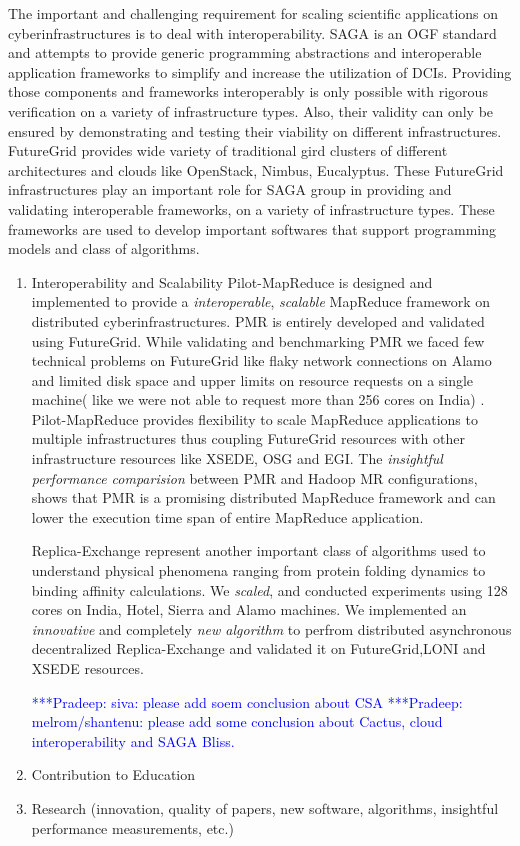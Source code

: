 \documentclass[]{paper}
\newcommand{\pmnote}[1]{ {\textcolor{blue} { ***Pradeep: #1 }}}
\newcommand{\pmnote}[1]{}
\begin{document}
The important and challenging requirement for scaling scientific applications on cyberinfrastructures is to deal with interoperability.  SAGA is an OGF standard and attempts to provide generic programming abstractions and interoperable application frameworks to simplify and increase the utilization of DCIs. Providing those components and frameworks interoperably is only possible with rigorous verification on a variety of infrastructure types. Also, their validity can only be ensured by demonstrating and testing their viability on different infrastructures. FutureGrid provides wide variety of traditional gird clusters of different architectures and clouds like OpenStack, Nimbus, Eucalyptus.  These FutureGrid infrastructures play an important role for SAGA group in providing and validating interoperable frameworks, on a variety of infrastructure types.  These frameworks are used to develop important softwares that support programming models and class of algorithms. 

\begin{enumerate}
\item Interoperability and Scalability
Pilot-MapReduce is designed  and implemented to provide a \textit{interoperable},  \textit{scalable} MapReduce framework on distributed cyberinfrastructures. PMR is entirely developed and validated using FutureGrid.  While validating and benchmarking PMR we faced few technical problems on FutureGrid like flaky network connections on Alamo and limited disk space and upper limits on resource requests on a single machine( like we were not able to request more than 256 cores on India) . Pilot-MapReduce provides flexibility to scale MapReduce applications to multiple infrastructures thus coupling FutureGrid resources with other infrastructure resources like XSEDE, OSG and EGI.  The \textit{insightful performance comparision} between PMR and Hadoop MR configurations, shows that PMR is a promising distributed MapReduce framework and can lower the execution time span of entire MapReduce application.

Replica-Exchange represent another important class of algorithms  used to understand physical phenomena ranging from protein folding dynamics to binding affinity calculations. We \textit{scaled},  and conducted experiments using 128 cores on India, Hotel, Sierra and Alamo machines. We implemented an \textit{innovative} and completely \textit{new algorithm} to perfrom distributed asynchronous decentralized Replica-Exchange and validated it on FutureGrid,LONI and XSEDE resources.

\pmnote{siva: please add soem conclusion about CSA}
\pmnote{melrom/shantenu: please add some conclusion about Cactus, cloud interoperability and SAGA Bliss.}


\item Contribution to Education
\item Research (innovation, quality of papers, new software, algorithms, insightful performance measurements, etc.)
\end{enumerate}
\end{document}
